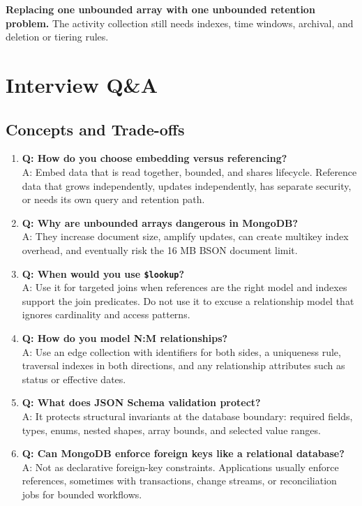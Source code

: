 \begin{pitfall}
\textbf{Replacing one unbounded array with one unbounded retention problem.} The activity collection still needs indexes, time windows, archival, and deletion or tiering rules.
\end{pitfall}

\section{Interview Q\&A}
\subsection{Concepts and Trade-offs}
\begin{enumerate}
    \item \textbf{Q: How do you choose embedding versus referencing?}\\
    A: Embed data that is read together, bounded, and shares lifecycle. Reference data that grows independently, updates independently, has separate security, or needs its own query and retention path.

    \item \textbf{Q: Why are unbounded arrays dangerous in MongoDB?}\\
    A: They increase document size, amplify updates, can create multikey index overhead, and eventually risk the 16 MB BSON document limit.

    \item \textbf{Q: When would you use \texttt{\$lookup}?}\\
    A: Use it for targeted joins when references are the right model and indexes support the join predicates. Do not use it to excuse a relationship model that ignores cardinality and access patterns.

    \item \textbf{Q: How do you model N:M relationships?}\\
    A: Use an edge collection with identifiers for both sides, a uniqueness rule, traversal indexes in both directions, and any relationship attributes such as status or effective dates.

    \item \textbf{Q: What does JSON Schema validation protect?}\\
    A: It protects structural invariants at the database boundary: required fields, types, enums, nested shapes, array bounds, and selected value ranges.

    \item \textbf{Q: Can MongoDB enforce foreign keys like a relational database?}\\
    A: Not as declarative foreign-key constraints. Applications usually enforce references, sometimes with transactions, change streams, or reconciliation jobs for bounded workflows.


\end{enumerate}
